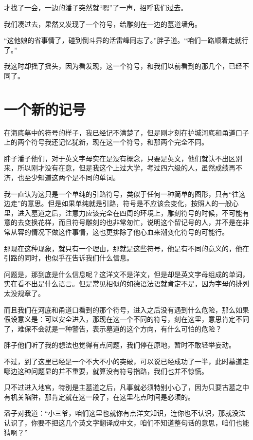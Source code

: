 才找了一会，一边的潘子突然就“嗯”了一声，招呼我们过去。

我们凑过去，果然又发现了一个符号，给雕刻在一边的墓道墙角。

“这他娘的省事情了，碰到倒斗界的活雷峰同志了。”胖子道。“咱们一路顺着走就行了。”

我这时却摇了摇头，因为看发现，这一个符号，和我们以前看到的那几个，已经不同了。

\chapter{一个新的记号}

在海底墓中的符号的样子，我已经记不清楚了，但是刚才刻在护城河底和甬道口子上的两个符号我还记忆犹新，现在这一个符号，和那两个完全不同。

胖子潘子他们，对于英文字母实在是没有概念，只要是英文，他们就认不出区别来，所以刚才没有在意，但是我这个上过大学，考过四六级的人，虽然成绩再不济，也至少知道这两个是不同的单词。

我一直认为这只是一个单纯的引路符号，类似于任何一种简单的图形，只有“往这边走”的意思。但是如果单纯就是引路，符号是不应该会变化，按照人的一般心里，进入墓道之后，注意力应该完全在四周的环境上，雕刻符号的时候，不可能有意的去变换花样，而且符号雕刻的也非常匆忙，说明这个留记号的人，并不是在非常从容的情况下做这件事情，这也更排除了他心血来潮变化符号的可能行。

那现在这种现象，就只有一个理由，那就是这些符号，他是有不同的意义的，他在引路的同时，也似乎在告诉我们什么信息。

问题是，那到底是什么信息呢？这洋文不是洋文，但是却是英文字母组成的单词，实在看不出是什么语言。但是常见相似的如德语法语就肯定不是，因为字母的排列太没规章了。

而且我们在河底和甬道口看到的那个符号，进入之后没有遇到什么危险，那么如果假设意义是：可以安全进入，那现在这一个不同的符号，刻在这里，意思肯定不同了，难保不会就是一种警告，表示墓道的这个方向，有什么可怕的危险？

胖子他们听了我的想法也觉得有点问题，我们停在原地，暂时不敢轻举妄动。

不过，到了这里已经是一个不大不小的突破，可以说已经成功了一半，此时墓道走哪边这种问题显的并不重要，就算没有符号指路，我们也并不惊慌。

只不过进入地宫，特别是主墓道之后，凡事就必须特别小心了，因为只要古墓之中有机关陷阱，那肯定就在这一段了，在这里花点时间是必须的。

潘子对我道：“小三爷，咱们这里也就你有点洋文知识，连你也不认识，那就没法认识了，你要不把这几个英文字翻译成中文，咱们不知道整句话的意思，咱们也能猜啊？”

